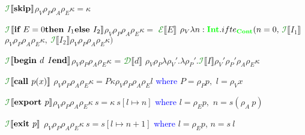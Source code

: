 \documentclass{article}
\newcommand{\gr}[1]{\textcolor{green}{\textbf{#1}}}
\newcommand{\bl}[1]{\textcolor{blue}{#1}}
\newcommand{\bd}[1]{\mbox{\bf#1}}
\newcommand{\lc}[1]{\textcolor{green}{$\mathcal{#1}$}}
\newcommand{\db}[1]{$\llbracket#1\rrbracket$}
\begin{document}
\lc{I}\db{\bd{skip}}$\rho_V \rho_P \rho_A \rho_E \kappa = \kappa $

\lc{I}\db{\bd{if } E = 0 \bd{ then }I_1\bd{ else }I_2}$ \rho_V \rho_P \rho_A \rho_E \kappa=$ \lc{E}\db{E} $\rho_V \lambda n: \gr{Int}. ifte_{\gr{Cont}}(n = 0,\: $\lc{I}\db{I_1}$\rho_V \rho_P \rho_A \rho_E \kappa,\:$\lc{I}\db{I_2}$\rho_V \rho_P \rho_A \rho_E \kappa)$

\lc{I}\db{\bd{begin }d \:\: I \bd{ end}}$\rho_V \rho_P \rho_A \rho_E \kappa$ = \lc{D}\db{d} $\rho_V \rho_P \lambda \rho_V'.\lambda \rho_P'.$\lc{I}\db{I}$\rho_V'\rho_P'\rho_A\rho_E\kappa$

\lc{I}\db{\bd{call } p(x)} $\rho_V \rho_P \rho_A \rho_E \kappa = P \kappa \rho_V \rho_P \rho_A \rho_E l$ \bl{where} $ P = \rho_P p,$ $l = \rho_V x$

\lc{I}\db{\bd{export }p}$\rho_V \rho_P \rho_A \rho_E \kappa \: s =\kappa \: s[l \mapsto n]$ \bl{where } $l = \rho_E p,$ $n = s (\rho_A \:p)$

\lc{I}\db{\bd{exit }p} $\rho_V \rho_P \rho_A \rho_E \kappa \: s = s[l \mapsto n+1]$ \bl{where } $l = \rho_E p$, $n = s\: l$
\end{document}

